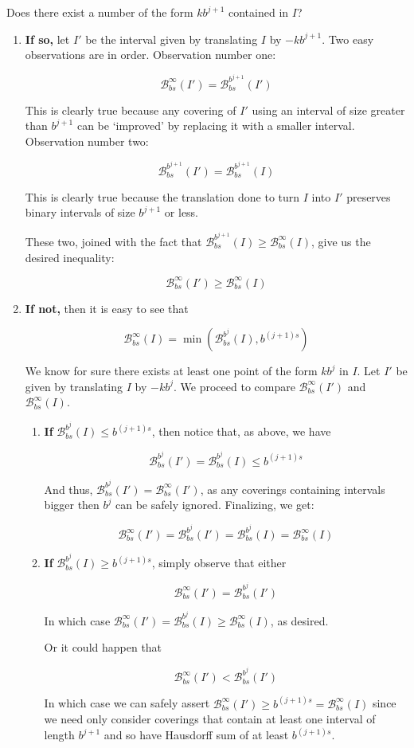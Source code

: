 \documentclass[11pt]{amsart}
\newcommand{\BB}{\mathcal{B}}
\begin{document}
Does there exist a number of the form $k b^{j+1}$ contained in $I$?
\begin{enumerate}

\item \textbf{If so,} let $I'$ be the interval given by translating $I$ by $-k b^{j+1}$. Two easy observations are in order. Observation number one:

\[\BB_{bs}^\infty(I') = \BB_{bs}^{b^{j+1}}(I')\]

This is clearly true because any covering of $I'$ using an interval of size greater than $b^{j+1}$ can be `improved' by replacing it with a smaller interval. Observation number two:

\[\BB_{bs}^{b^{j+1}}(I') = \BB_{bs}^{b^{j+1}}(I)\]

This is clearly true because the translation done to turn $I$ into $I'$ preserves binary intervals of size $b^{j+1}$ or less.

These two, joined with the fact that $\BB_{bs}^{b^{j+1}}(I) \geq \BB_{bs}^\infty(I)$, give us the desired inequality:

\[\BB_{bs}^\infty(I') \geq \BB_{bs}^\infty(I)\]

\item \textbf{If not,} then it is easy to see that

\[\BB_{bs}^\infty(I) = \min(\BB_{bs}^{b^j}(I), b^{(j+1)s})\]

We know for sure there exists at least one point of the form $k b^j$ in $I$. Let $I'$ be given by translating $I$ by $-k b^j$. We proceed to compare $\BB_{bs}^\infty(I')$ and $\BB_{bs}^\infty(I)$.

\begin{enumerate}

\item \textbf{If} $\BB_{bs}^{b^j}(I) \leq b^{(j+1)s}$, then notice that, as above, we have

\[\BB_{bs}^{b^j}(I') = \BB_{bs}^{b^j}(I) \leq b^{(j+1)s}\]

And thus, $\BB_{bs}^{b^j}(I') = \BB_{bs}^\infty(I')$, as any coverings containing intervals bigger then $b^j$ can be safely ignored. Finalizing, we get:

\[\BB_{bs}^\infty(I') = \BB_{bs}^{b^j}(I') = \BB_{bs}^{b^j}(I) = \BB_{bs}^\infty(I)\]

\item \textbf{If} $\BB_{bs}^{b^j}(I) \geq b^{(j+1)s}$, simply observe that either

\[\BB_{bs}^\infty(I') = \BB_{bs}^{b^j}(I')\]

In which case $\BB_{bs}^\infty(I') = \BB_{bs}^{b^j}(I) \geq \BB_{bs}^\infty(I)$, as desired.

Or it could happen that

\[\BB_{bs}^\infty(I') < \BB_{bs}^{b^j}(I')\]

In which case we can safely assert $\BB_{bs}^\infty(I') \geq b^{(j+1)s} = \BB_{bs}^\infty(I)$ since we need only consider coverings that contain at least one interval of length $b^{j+1}$ and so have Hausdorff sum of at least $b^{(j+1)s}$.
\end{enumerate}
\end{enumerate}
\end{document}
